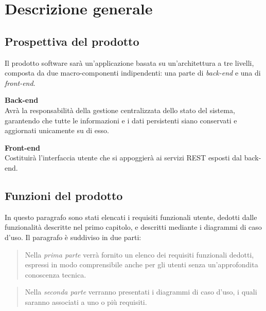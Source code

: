 \chapter{Descrizione generale} %


\section{Prospettiva del prodotto}
Il prodotto software sarà un'applicazione basata su un'architettura a tre livelli, composta da due macro-componenti indipendenti: una parte di \textit{back-end} e una di \textit{front-end}. 

\textbf{Back-end} \\
Avrà la responsabilità della gestione centralizzata dello stato del sistema, garantendo che tutte le informazioni e i dati persistenti siano conservati e aggiornati unicamente su di esso.

\textbf{Front-end} \\
Costituirà l'interfaccia utente che si appoggierà ai servizi REST esposti dal back-end.

\section{Funzioni del prodotto}
In questo paragrafo sono stati elencati i requisiti funzionali utente, dedotti dalle funzionalità descritte nel primo capitolo, e descritti mediante i diagrammi di caso d'uso.
Il paragrafo è suddiviso in due parti:

\begin{quote}
Nella \textit{prima parte} verrà fornito un elenco dei requisiti funzionali dedotti, espressi in modo comprensibile anche per gli utenti senza un'approfondita conoscenza tecnica.     
\end{quote}

\begin{quote}
Nella \textit{seconda parte} verranno presentati i diagrammi di caso d'uso, i quali saranno associati a uno o più requisiti.
\end{quote}

